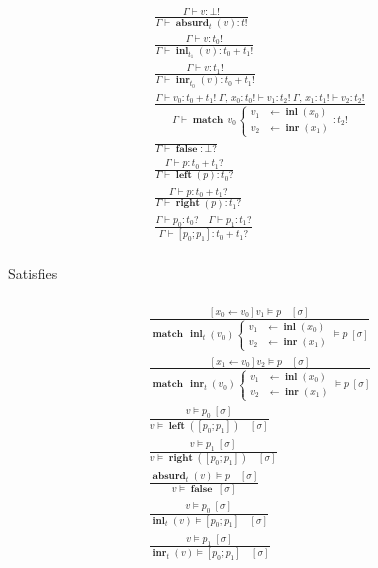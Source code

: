 \documentclass[twocolumn]{scrartcl}
\DeclareMathOperator{\absurd}{\textbf{absurd}}
\DeclareMathOperator{\inl}{\textbf{inl}}
\DeclareMathOperator{\inr}{\textbf{inr}}
\DeclareMathOperator{\false}{\textbf{false}}
\DeclareMathOperator{\lft}{\textbf{left}}
\DeclareMathOperator{\rgt}{\textbf{right}}
\DeclareMathOperator{\update}{\leftarrow}
\DeclareMathOperator{\case}{\textbf{match}}
\begin{document}
\begin{multline*}
  \\
\frac{
  \Gamma \vdash v \colon \bot !
}{
  \Gamma \vdash \absurd_t(v) \colon t !
}\\
\frac{
  \Gamma \vdash v \colon t_0 !
}{
  \Gamma \vdash \inl_{t_1}(v) \colon t_0 + t_1 !
}\\
\frac{
  \Gamma \vdash v \colon t_1 !
}{
  \Gamma \vdash \inr_{t_0}(v) \colon t_0 + t_1 !
}\\
\frac{
  \Gamma \vdash v_0 \colon t_0 + t_1 ! \;
  \Gamma , \, x_0 \colon t_0 ! \vdash v_1 \colon t_2 ! \;
  \Gamma , \, x_1 \colon t_1 ! \vdash v_2 \colon t_2 !
}{
  \Gamma \vdash
  \case \, v_0 \,
  \begin{cases}
   v_1 & \leftarrow \inl(x_0) \\
   v_2 & \leftarrow \inr(x_1)
  \end{cases}
  \colon t_2 !
}\\
\frac{
}{
  \Gamma \vdash \false \colon \bot ?
}\\
\frac{
  \Gamma \vdash p \colon t_0 + t_1 ?
}{
  \Gamma \vdash \lft(p) \colon t_0 ?
}\\
\frac{
  \Gamma \vdash p \colon t_0 + t_1 ?
}{
  \Gamma \vdash \rgt(p) \colon t_1 ?
}\\
\frac{
  \Gamma \vdash p_0 \colon t_0 ? \quad
  \Gamma \vdash p_1 \colon t_1 ?
}{
  \Gamma \vdash [ p_0 ; p_1 ] \colon t_0 + t_1 ?
}\\
\end{multline*}

Satisfies

\begin{multline*}
  \\
\frac{
  [x_0 \update v_0] v_1 \models p \quad [\sigma]
}{
  \case \, \inl_t(v_0) \,
  \begin{cases}
    v_1 & \leftarrow \inl(x_0) \\
    v_2 & \leftarrow \inr(x_1)
  \end{cases}
 \models p \; [\sigma]
}\\
\frac{
  [x_1 \update v_0] v_2 \models p \quad [\sigma]
}{
  \case \, \inr_t(v_0) \,
  \begin{cases}
    v_1 & \leftarrow \inl(x_0) \\
    v_2 & \leftarrow \inr(x_1)
  \end{cases}
  \models p \; [\sigma]
}\\
\frac{
  v \models p_0 \; [\sigma]
}{
  v \models \lft([ p_0 ; p_1 ]) \quad [\sigma]
}\\
\frac{
  v \models p_1 \; [\sigma]
}{
  v \models \rgt([ p_0 ; p_1 ]) \quad [\sigma]
}\\
\frac{
  \absurd_t(v) \models p \quad [\sigma]
}{
  v \models \false \; [\sigma]
}\\
\frac{
  v \models p_0 \; [\sigma]
}{
  \inl_t(v) \models [ p_0 ; p_1 ] \quad [\sigma]
}\\
\frac{
  v \models p_1 \; [\sigma]
}{
  \inr_t(v) \models [ p_0 ; p_1 ] \quad [\sigma]
}\\
\end{multline*}
\end{document}
